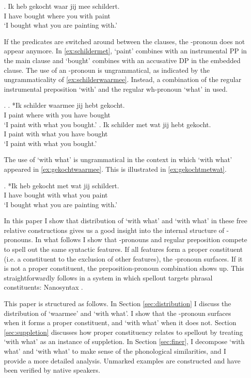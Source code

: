 \documentclass{article}
\begin{document}
\exg. Ik heb gekocht waar jij mee schildert.\\
 I have bought where you with paint\\
 `I bought what you are painting with.'\label{ex:gekochtwaarmee}

If the predicates are switched around between the clauses, the -pronoun does not appear anymore. In \ref{ex:schildermet},  `paint' combines with an instrumental PP in the main clause and  `bought' combines with an accusative DP in the embedded clause. The use of an -pronoun is ungrammatical, as indicated by the ungrammaticality of \ref{ex:schilderwaarmee}. Instead, a combination of the regular instrumental preposition  `with' and the regular wh-pronoun  `what' in used.

\ex.\label{ex:schildermet}
\ag. *Ik schilder waarmee jij hebt gekocht.\\
 I paint {where with} you have bought\\
 `I paint with what you bought.'\label{ex:schilderwaarmee}
\bg. Ik schilder met wat jij hebt gekocht.\\
 I paint with what you have bought\\
 `I paint with what you bought.'\label{ex:schildermetwat}

The use of  `with what' is ungrammatical in the context in which  `with what' appeared in \ref{ex:gekochtwaarmee}. This is illustrated in \ref{ex:gekochtmetwat}.

\exg. *Ik heb gekocht met wat jij schildert.\\
 I have bought with what you paint\\
 `I bought what you are painting with.'\label{ex:gekochtmetwat}

In this paper I show that distribution of  `with what' and  `with what' in these free relative constructions gives us a good insight into the internal structure of -pronouns. In what follows I show that -pronouns and regular preposition compete to spell out the same syntactic features. If all features form a proper constituent (i.e. a constituent to the exclusion of other features), the -pronoun surfaces. If it is not a proper constituent, the preposition-pronoun combination shows up. This straightforwardly follows in a system in which spellout targets phrasal constituents: Nanosyntax \citep{starke2009}.

This paper is structured as follows. In Section \ref{sec:distribution} I discuss the distribution of  `waarmee' and  `with what'. I show that the -pronoun surfaces when it forms a proper constituent, and  `with what' when it does not. Section \ref{sec:suppletion} discusses how proper constituency relates to spellout by treating  `with what' as an instance of suppletion. In Section \ref{sec:finer}, I decompose  `with what' and  `with what' to make sense of the phonological similarities, and I provide a more detailed analysis. Unmarked examples are constructed and have been verified by native speakers.
\end{document}
